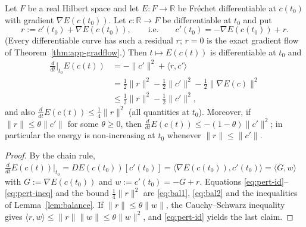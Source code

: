 \begin{Theorem}\label{thm:perturbed}
Let $F$ be a real Hilbert space and let $E:F\to\mathbb{R}$ be Fr\'echet differentiable at $c(t_0)$ with gradient $\nabla E(c(t_0))$.
Let $c:\mathbb{R}\to F$ be differentiable at $t_0$ and put
\[
r:=c'(t_0)+\nabla E(c(t_0)),\qquad\text{i.e.}\qquad c'(t_0)=-\nabla E(c(t_0))+r .
\]
(Every differentiable curve has such a residual $r$; $r=0$ is the exact gradient flow of Theorem~\ref{thm:app-gradflow}.)
Then $t\mapsto E(c(t))$ is differentiable at $t_0$ and
\begin{align}
\frac{d}{dt}\bigg|_{t_0}E(c(t)) &= -\|c'\|^2+\langle r,c'\rangle \label{eq:pert-id}\\
&=\tfrac12\|r\|^2-\tfrac12\|c'\|^2-\tfrac12\|\nabla E(c)\|^2 \label{eq:pert-exact}\\
&\le \tfrac12\|r\|^2-\tfrac12\|c'\|^2, \label{eq:pert-ineq}
\end{align}
and also $\frac{d}{dt}E(c(t))\le\tfrac14\|r\|^2$ (all quantities at $t_0$). Moreover, if $\|r\|\le\theta\|c'\|$ for some $\theta\ge0$, then $\frac{d}{dt}E(c(t))\le-(1-\theta)\|c'\|^2$; in particular the energy is non-increasing at $t_0$ whenever $\|r\|\le\|c'\|$.
\end{Theorem}
\begin{proof}
By the chain rule, $\frac{d}{dt}E(c(t))\big|_{t_0}=DE(c(t_0))[c'(t_0)]=\langle\nabla E(c(t_0)),c'(t_0)\rangle=\langle G,w\rangle$ with $G:=\nabla E(c(t_0))$ and $w:=c'(t_0)=-G+r$.
Equations \eqref{eq:pert-id}--\eqref{eq:pert-ineq} and the bound $\tfrac14\|r\|^2$ are \eqref{eq:bal1}, \eqref{eq:bal2} and the inequalities of Lemma~\ref{lem:balance}.
If $\|r\|\le\theta\|w\|$, the Cauchy--Schwarz inequality gives $\langle r,w\rangle\le\|r\|\|w\|\le\theta\|w\|^2$, and \eqref{eq:pert-id} yields the last claim.
\end{proof}

